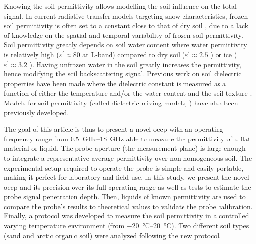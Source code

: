 Knowing the soil permittivity allows modelling the soil influence on the total signal.
In current radiative transfer models targeting snow characteristics, frozen soil permittivity is often set to a constant close to that of dry soil \parencite{Hallikainen1985,Kerr2012}, due to a lack of knowledge on the spatial and temporal variability of frozen soil permittivity.
Soil permittivity greatly depends on soil water content \parencite{Topp1980} where water permittivity is relatively high (\(\varepsilon^\prime \approx 80\) at L-band) compared to dry soil (\(\varepsilon^\prime \approx 2.5\) \parencite{Matzler1998}) or ice (\(\varepsilon^\prime \approx 3.2\) \parencite{Matzler1987}).
Having unfrozen water in the soil greatly increases the permittivity, hence modifying the soil backscattering signal.
Previous work on soil dielectric properties have been made where the dielectric constant is measured as a function of either the temperature and/or the water content and the soil texture \parencite{Cihlar1974,Hoekstra1974,Bobrov2015,Kabir2020}.
Models for soil permittivity (called dielectric mixing models, \parencite{Dobson1985,Hallikainen1985,Mironov2009,Zhang2010}) have also been previously developed.

The goal of this article is thus to present a novel \ac{oecp} with an operating frequency range from \SIrange{0.5}{18}{\giga\hertz} able to measure the permittivity of a flat material or liquid.
The probe aperture (the measurement plane) is large enough to integrate a representative average permittivity over non-homogeneous soil.
The experimental setup required to operate the probe is simple and easily portable, making it perfect for laboratory and field use.
In this study, we present the novel \ac{oecp} and its precision over its full operating range as well as tests to estimate the probe signal penetration depth.
Then, liquids of known permittivity are used to compare the probe's results to theoretical values to validate the probe calibration.
Finally, a protocol was developed to measure the soil permittivity in a controlled varying temperature environment (from \qtyrange{-20}{20}{\degreeCelsius}).
Two different soil types (sand and arctic organic soil) were analyzed following the new protocol.

